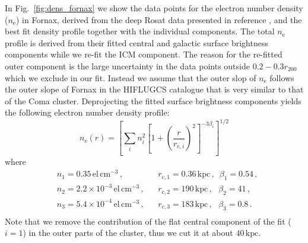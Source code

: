 \documentclass[10pt,aps,pra,reprint,amsmath,amsfonts,amssymb,showpacs,nofootinbib,floatfix]{revtex4-1}
\newcommand{\rmn}{\mathrm}
\newcommand{\kpc}{\rmn{kpc}}
\newcommand{\rvir}{r_{200}}
\newcommand{\e}{\rmn{e}}
\begin{document}
In Fig.~\ref{fig:dens_fornax} we show the data points for the electron
number density ($n_\e$) in Fornax, derived from the deep Rosat data
presented in reference \cite{2002ApJ...565..883P}, and the best fit
density profile together with the individual components. The total
$n_\e$ profile is derived from their fitted central and galactic
surface brightness components while we re-fit the ICM component. The
reason for the re-fitted outer component is the large uncertainty in
the data points outside $0.2-0.3\rvir$ which we exclude in our
fit. Instead we assume that the outer slop of $n_\e$ follows the outer
slope of Fornax in the HIFLUGCS catalogue that is very similar to that
of the Coma cluster. Deprojecting the fitted surface brightness
components yields the following electron number density profile:
\begin{equation}
n_\e(r) = \left[\sum_i n_i^2\left[1+\left(\frac{r}{r_{c,i}}\right)^2\right]^{-3\beta_i}\right]^{1/2}
\end{equation}
where
\begin{align}
&n_1 = 0.35\, \rmn{el}\,\rmn{cm}^{-3}\,,
&&r_{c,1} = 0.36\,\kpc\,,\,\,\,
\beta_1 = 0.54\,, \nonumber\\
&n_2 = 2.2\times10^{-3}\,\rmn{el}\,\rmn{cm}^{-3}\,,
&&r_{c,2} = 190\,\kpc\,,\,\,\,\,
\beta_2 = 41\,, \nonumber\\
&n_3 = 5.4\times10^{-4}\,\rmn{el}\,\rmn{cm}^{-3}\,,
&&r_{c,3} = 183\,\kpc\,,\,\,\,\,
\beta_3 = 0.8\,. \nonumber\\
& &&
\label{fit_fornax}
\end{align}
Note that we remove the contribution of the flat central component of
the fit ($i=1$) in the outer parts of the cluster, thus we cut it at
about $40\,\kpc$.
\end{document}
